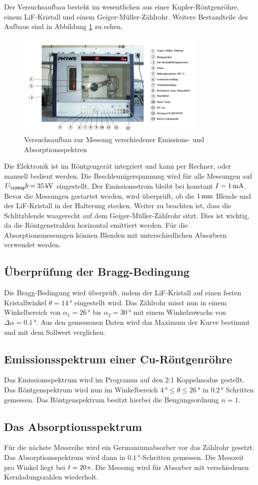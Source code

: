 Der Versuchsaufbau besteht im wesentlichen aus einer Kupfer-Röntgenröhre,
einem LiF-Kristall und einem Geiger-Müller-Zählrohr. Weitere Bestandteile des
Aufbaus sind in Abbildung \ref{fig:aufbau} zu sehen.
\begin{figure}[H]
  \centering
  \includegraphics[width=0.8\textwidth]{bilder/aufbau.pdf}
  \caption{Versuchsaufbau zur Messung verschiedener Emissions- und Absorptionsspektren
  \cite{V602}}
  \label{fig:aufbau}
\end{figure}
Die Elektronik ist im Röntgengerät integriert und kann per Rechner, oder
manuell bedient werden. Die Beschleunigerspannung wird für alle Messungen auf
$U_\su{b}=35\kVolt$ eingestellt. Der Emissionsstrom bleibt bei konstant
$I=1\,\si{\milli\ampere}$. Bevor die Messungen gestartet werden, wird überprüft, ob die $1\,\si{\milli\meter}$
Blende und der LiF-Kristall in der Halterung stecken. Weiter zu beachten ist,
dass die Schlitzblende waagerecht auf dem Geiger-Müller-Zählrohr sitzt. Dies
ist wichtig, da die Röntgenstrahlen horizontal emittiert werden.
Für die Absorptionsmessungen können Blenden mit unterschiedlichen Absorbern
verwendet werden.
\subsection{Überprüfung der Bragg-Bedingung}
Die Bragg-Bedingung wird überprüft, indem der LiF-Kristall auf einen festen
Kristallwinkel $\theta=14\,\si{\degree}$ eingestellt wird. Das Zählrohr misst nun in einem
Winkelbereich von $\alpha_1=26\,\si{\degree}$ bis $\alpha_2=30\,\si{\degree}$ mit einem Winkelzuwachs
von $\Delta\alpha=0.1\,\si{\degree}$. Aus den gemessenen Daten wird das Maximum der Kurve
bestimmt und mit dem Sollwert verglichen.
\subsection{Emissionsspektrum einer Cu-Röntgenröhre}
Das Emissionsspektrum wird im Programm auf den 2:1 Koppelmodus gestellt. Das
Röntgenspektrum wird nun im Winkelbereich $4\,\si{\degree}\leq\theta\leq 26\,\si{\degree}$ in $0.2\,\si{\degree}$
Schritten gemessen. Das Röntgenspektrum besitzt hierbei die Beugungsordnung
$n=1$.
\subsection{Das Absorptionsspektrum}
Für die nächste Messreihe wird ein Germaniumabsorber vor das Zählrohr gesetzt.
Das Absorptionsspektrum wird dann in $0.1\,\si{\degree}$-Schritten gemessen. Die Messzeit pro
Winkel liegt bei $t=20\,\si{\second}$. Die Messung wird für Absorber mit verschiedenen
Kernladungszahlen wiederholt.
